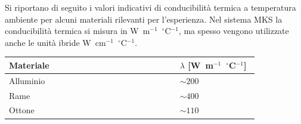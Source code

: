 \documentclass{lab1-article}
\begin{document}
\begin{article}
\newpage


Si riportano di seguito i valori indicativi di conducibilit\`a termica a
temperatura ambiente per alcuni materiali rilevanti per l'esperienza.
Nel sistema MKS la conducibilit\`a termica si misura in
W~m$^{-1}$~$^\circ$C$^{-1}$, ma spesso vengono utilizzate anche le unit\`a
ibride W~cm$^{-1}$~$^\circ$C$^{-1}$.

\medskip

\begin{center}
\begin{tabular}{p{0.65\linewidth}@{}p{0.3\linewidth}}
\hline
Materiale & $\lambda$ [W~m$^{-1}$~$^\circ$C$^{-1}$]\\
\hline
\hline
Alluminio & $\sim 200$\\
Rame & $\sim 400$\\
Ottone & $\sim 110$\\
\hline
\end{tabular}
\end{center}

\onecolumn




\end{article}
\end{document}
